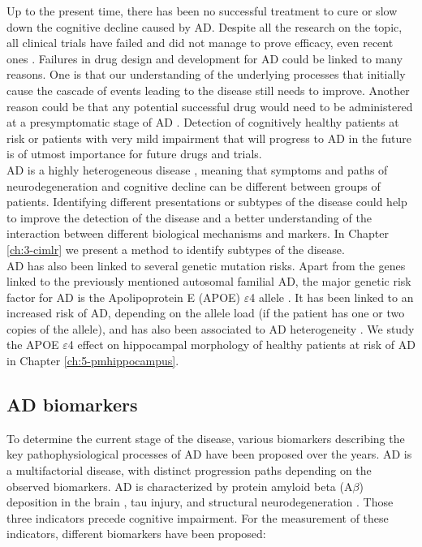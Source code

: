 Up to the present time, there has been no successful treatment to cure or slow down the cognitive decline caused by AD. Despite all the research on the topic, all clinical trials have failed \cite{Mehta2017} and did not manage to prove efficacy, even recent ones \cite{Huang2020}. Failures in drug design and development for AD could be linked to many reasons. One is that our understanding of the underlying processes that initially cause the cascade of events leading to the disease still needs to improve. Another reason could be that any potential successful drug would need to be administered at a presymptomatic stage of AD \cite{Mehta2017,Huang2020}. Detection of cognitively healthy patients at risk or patients with very mild impairment that will progress to AD in the future is of utmost importance for future drugs and trials. \\ 

AD is a highly heterogeneous disease \cite{Lam2013}, meaning that symptoms and paths of neurodegeneration and cognitive decline can be different between groups of patients. Identifying different presentations or subtypes of the disease could help to improve the detection of the disease and a better understanding of the interaction between different biological mechanisms and markers. In Chapter \ref{ch:3-cimlr} we present a method to identify subtypes of the disease. \\

AD has also been linked to several genetic mutation risks. Apart from the genes linked to the previously mentioned autosomal familial AD, the major genetic risk factor for AD is the Apolipoprotein E (APOE) $\varepsilon$4 allele \cite{Saunders1993}. It has been linked to an increased risk of AD, depending on the allele load \cite{Liu2013a} (if the patient has one or two copies of the allele), and has also been associated to AD heterogeneity \cite{Emrani2020}. We study the APOE $\varepsilon$4 effect on hippocampal morphology of healthy patients at risk of AD in Chapter \ref{ch:5-pmhippocampus}.

\subsection{AD biomarkers}

To determine the current stage of the disease, various biomarkers describing the key pathophysiological processes of AD have been proposed over the years. AD is a multifactorial disease, with distinct progression paths depending on the observed biomarkers. AD is characterized by protein amyloid beta (A$\beta$) deposition in the brain \cite{Rissman2012}, tau injury, and structural neurodegeneration \cite{Jack2013}. Those three indicators precede cognitive impairment. For the measurement of these indicators, different biomarkers have been proposed:


